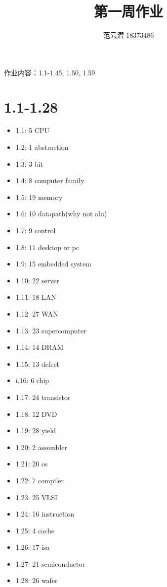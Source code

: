 \documentclass[lang=cn,11pt,a4paper,cite=authoryear]{elegantpaper}
\title{第一周作业}
\author{范云潜 18373486}
\institute{微电子学院 184111 班}
\date{\zhtoday}
\begin{document}
\maketitle

作业内容：1.1-1.45, 1.50, 1.59

\tableofcontents


\section{1.1-1.28}

\begin{itemize}
    \item 1.1: 5 CPU
    \item 1.2: 1 abstraction
    \item 1.3: 3 bit 
    \item 1.4: 8 computer family
    \item 1.5: 19 memory
    \item 1.6: 10 datapath(why not alu)
    \item 1.7: 9 control
    \item 1.8: 11 desktop or pc
    \item 1.9: 15 embedded system
    \item 1.10: 22 server 
    \item 1.11: 18 LAN 
    \item 1.12: 27 WAN 
    \item 1.13: 23 supercomputer
    \item 1.14: 14 DRAM
    \item 1.15: 13 defect
    \item i.16: 6 chip
    \item 1.17: 24 transistor
    \item 1.18: 12 DVD
    \item 1.19: 28 yield
    \item 1.20: 2 assembler
    \item 1.21: 20 os
    \item 1.22: 7 compiler
    \item 1.23: 25 VLSI
    \item 1.24: 16 instruction
    \item 1.25: 4 cache
    \item 1.26: 17 isa 
    \item 1.27: 21 semiconductor
    \item 1.28: 26 wafer 
\end{itemize}
\end{document}
